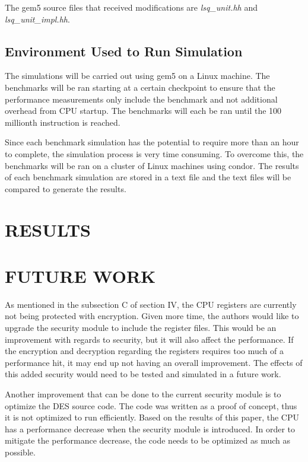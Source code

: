 \documentclass[letterpaper, 10 pt, conference]{ieeeconf}  %
\begin{document}
The gem5 source files that received modifications are \emph{lsq\_unit.hh} and \emph{lsq\_unit\_impl.hh}.
  

\subsection{Environment Used to Run Simulation}

The simulations will be carried out using gem5 on a Linux machine.  The benchmarks will be ran starting at a certain checkpoint to ensure that the performance measurements only include the benchmark and not additional overhead from CPU startup.  The benchmarks will each be ran  until the 100 millionth instruction is reached.

Since each benchmark simulation has the potential to require more than an hour to complete, the simulation process is very time consuming.  To overcome this, the benchmarks will be ran on a cluster of Linux machines using condor.  The results of each benchmark simulation are stored in a text file and the text files will be compared to generate the results.   

\section{RESULTS}



\section{FUTURE WORK}

As mentioned in the subsection C of section IV, the CPU registers are currently not being protected with encryption.  Given more time, the authors would like to upgrade the security module to include the register files.  This would be an improvement with regards to security, but it will also affect the performance.  If the encryption and decryption regarding the registers requires too much of a performance hit, it may end up not having an overall improvement.  The  effects of this added security would need to be tested and simulated in a future work.

Another improvement that can be done to the current security module is to optimize the DES source code.  The code was written as a proof of concept, thus it is not optimized to run efficiently.  Based on the results of this paper, the CPU has a performance decrease when the security module is introduced.  In order to mitigate the performance decrease, the code needs to be optimized as much as possible.
\end{document}
